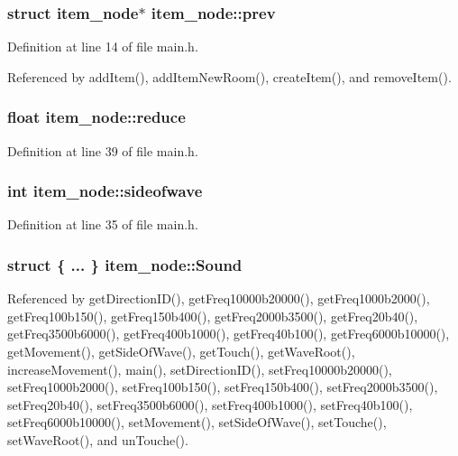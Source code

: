 \subsubsection[{prev}]{\setlength{\rightskip}{0pt plus 5cm}struct {\bf item\+\_\+node}$\ast$ item\+\_\+node\+::prev}\hypertarget{structitem__node_a9502aa572d7f0b75060d190dc3de3f1d}{}\label{structitem__node_a9502aa572d7f0b75060d190dc3de3f1d}


Definition at line 14 of file main.\+h.



Referenced by add\+Item(), add\+Item\+New\+Room(), create\+Item(), and remove\+Item().

\subsubsection[{reduce}]{\setlength{\rightskip}{0pt plus 5cm}float item\+\_\+node\+::reduce}\hypertarget{structitem__node_a646507ee88a47e76648e7270b051ea2b}{}\label{structitem__node_a646507ee88a47e76648e7270b051ea2b}


Definition at line 39 of file main.\+h.

\subsubsection[{sideofwave}]{\setlength{\rightskip}{0pt plus 5cm}int item\+\_\+node\+::sideofwave}\hypertarget{structitem__node_a77861ad11dd6c8a8f917ced69e388e8e}{}\label{structitem__node_a77861ad11dd6c8a8f917ced69e388e8e}


Definition at line 35 of file main.\+h.

\subsubsection[{Sound}]{\setlength{\rightskip}{0pt plus 5cm}struct \{ ... \}   item\+\_\+node\+::\+Sound}\hypertarget{structitem__node_ae6671661190e93efee5a39ecfade977b}{}\label{structitem__node_ae6671661190e93efee5a39ecfade977b}


Referenced by get\+Direction\+I\+D(), get\+Freq10000b20000(), get\+Freq1000b2000(), get\+Freq100b150(), get\+Freq150b400(), get\+Freq2000b3500(), get\+Freq20b40(), get\+Freq3500b6000(), get\+Freq400b1000(), get\+Freq40b100(), get\+Freq6000b10000(), get\+Movement(), get\+Side\+Of\+Wave(), get\+Touch(), get\+Wave\+Root(), increase\+Movement(), main(), set\+Direction\+I\+D(), set\+Freq10000b20000(), set\+Freq1000b2000(), set\+Freq100b150(), set\+Freq150b400(), set\+Freq2000b3500(), set\+Freq20b40(), set\+Freq3500b6000(), set\+Freq400b1000(), set\+Freq40b100(), set\+Freq6000b10000(), set\+Movement(), set\+Side\+Of\+Wave(), set\+Touche(), set\+Wave\+Root(), and un\+Touche().

